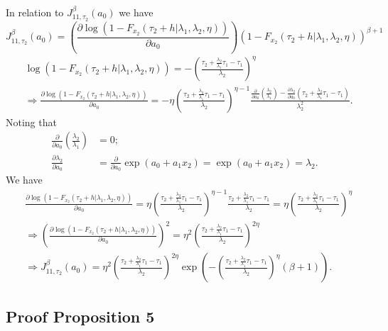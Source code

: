 \documentclass{article}
\begin{document}
In relation to $J_{11,\tau_2}^{\beta}(a_0)$ we have
\begin{equation*}
J_{11,\tau_2}^{\beta} (a_0)=\left(\frac{\partial \log\left(1-F_{x_2}(\tau_2+h|\lambda_1,\lambda_2,\eta)\right)}{\partial a_0}\right)\left(1-F_{x_2}(\tau_2+h|\lambda_1,\lambda_2,\eta)\right)^{\beta+1}
\end{equation*}
\begin{align*}
&\log\left(1-F_{x_2}(\tau_2+h|\lambda_1,\lambda_2,\eta)\right)=-\left(\frac{\tau_2+\frac{\lambda_2}{\lambda_1}\tau_1-\tau_1}{\lambda_2}\right)^\eta
\\
&\Rightarrow \frac{\partial \log\left(1-F_{x_2}(\tau_2+h|\lambda_1,\lambda_2,\eta)\right)}{\partial a_0}=-\eta \left(\frac{\tau_2+\frac{\lambda_2}{\lambda_1}\tau_1-\tau_1}{\lambda_2}\right)^{\eta-1} \frac{\frac{\partial}{\partial a_0}\left(\frac{\lambda_2}{\lambda_1}\right)-\frac{\partial\lambda_2}{\partial a_0}(\tau_2+\frac{\lambda_2}{\lambda_1}\tau_1-\tau_1)}{\lambda_2^2}.
\end{align*}
Noting that
\begin{align*}
\frac{\partial}{\partial a_0}\left(\frac{\lambda_2}{\lambda_1}\right)&=0;
\\
\frac{\partial \lambda_2}{\partial a_0}&=\frac{\partial}{\partial a_0} \exp(a_0+a_1x_2) = \exp(a_0+a_1x_2)=\lambda_2.
\end{align*}
We have
\begin{align*}
&\frac{\partial \log\left(1-F_{x_2}(\tau_2+h|\lambda_1,\lambda_2,\eta)\right)}{\partial a_0}=\eta \left(\frac{\tau_2+\frac{\lambda_2}{\lambda_1}\tau_1-\tau_1}{\lambda_2}\right)^{\eta-1} \frac{\tau_2+ \frac{\lambda_2}{\lambda_1}\tau_1-\tau_1}{\lambda_2}=\eta \left(\frac{\tau_2+\frac{\lambda_2}{\lambda_1}\tau_1-\tau_1}{\lambda_2}\right)^{\eta} 
\\
&\Rightarrow \left(\frac{\partial \log\left(1-F_{x_2}(\tau_2+h|\lambda_1,\lambda_2,\eta)\right)}{\partial a_0}\right)^2=\eta^2 \left(\frac{\tau_2+\frac{\lambda_2}{\lambda_1}\tau_1-\tau_1}{\lambda_2}\right)^{2\eta} 
\\
&\Rightarrow  J_{11,\tau_2}^{\beta}(a_0)=\eta^2 \left(\frac{\tau_2+\frac{\lambda_2}{\lambda_1}\tau_1-\tau_1}{\lambda_2}\right)^{2\eta} \exp\left(-\left(\frac{\tau_2+\frac{\lambda_2}{\lambda_1}\tau_1-\tau_1}{\lambda_2}\right)^{\eta}(\beta+1)\right).
\end{align*}

\subsection{Proof Proposition 5}
\end{document}
